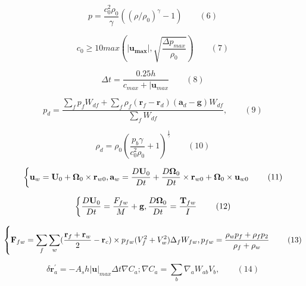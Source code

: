 \documentclass[UTF8]{ctexart}
\begin{document}
\begin{equation}
    p=\frac{c_0^2 \rho_0}{\gamma}((\rho / \rho_0)^\gamma-1) \qquad (6)
\end{equation}

\begin{equation}
    c_0 \ge 10 max(|\mathbf{u_{max}}|,\sqrt{\frac{\Delta p_{max}}{\rho_0}}) \qquad (7)
\end{equation}

\begin{equation}
    \Delta t = \frac{0.25h}{c_{max}+|\mathbf{u}_{max}} \qquad (8)
\end{equation}

\begin{equation}
    p_d = \frac{\sum_{f}p_f W_{df} + \sum_{f}\rho_f(\mathbf{r}_f-\mathbf{r}_d)(\mathbf{a}_d-\mathbf{g})W_{df}}{\sum_{f}W_{df}}, \qquad (9)
\end{equation}

\begin{equation}
    \rho_d = \rho_0(\frac{p_b \gamma}{c_0^2\rho_0}+1)^{\frac{1}{\gamma}} \qquad (10)
\end{equation}

\begin{equation}
    \left\{ \mathbf{u}_w =  \mathbf{U}_0 + \mathbf{\Omega}_0 \times \mathbf{r}_{w0}, \\
    \mathbf{a}_w = \frac{D \mathbf{U}_0}{Dt}+\frac{D \mathbf{\Omega}_0}{Dt}\times\mathbf{r}_{w0}+\mathbf{\Omega}_0\times\mathbf{u}_{w0} \right. \qquad (11)
\end{equation}

\begin{equation}
    \left\{ \frac{D \mathbf{U}_0}{Dt}=\frac{F_{fw}}{M}+\mathbf{g}, \\
    \frac{D \mathbf{\Omega}_0}{Dt} = \frac{\mathbf{T}_{fw}}{I} \right. \qquad (12)
\end{equation}

\begin{equation}
    \left\{ \mathbf{F}_{fw} = \sum_{f}\sum_{w}(\frac{\mathbf{r}_f+\mathbf{r}_w}{2}-\mathbf{r}_c)\times p_{fw}(V_f^2+V_w^2)\Delta_f W_{fw}, \\
    p_{fw}=\frac{\rho_w p_f+\rho_f p_2}{\rho_f+\rho_w} \right. \qquad (13)
\end{equation}

\begin{equation}
\delta \mathbf{r}^{'}_a = -A_s h |\mathbf{u}|_{max} \Delta t \nabla C_a;\nabla C_a = \sum_{b}\nabla_a W_{ab} V_b , \qquad (14)
\end{equation}
\end{document}
